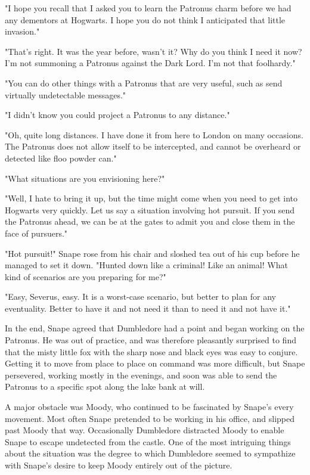 \documentclass[a4paper,11pt]{article}
\begin{document}
"I hope you recall that I asked you to learn the Patronus charm before we had any dementors at Hogwarts. I hope you do not think I anticipated that little invasion."

"That's right. It was the year before, wasn't it? Why do you think I need it now? I'm not summoning a Patronus against the Dark Lord. I'm not that foolhardy."

"You can do other things with a Patronus that are very useful, such as send virtually undetectable messages."

"I didn't know you could project a Patronus to any distance."

"Oh, quite long distances. I have done it from here to London on many occasions. The Patronus does not allow itself to be intercepted, and cannot be overheard or detected like floo powder can."

"What situations are you envisioning here?"

"Well, I hate to bring it up, but the time might come when you need to get into Hogwarts very quickly. Let us say a situation involving hot pursuit. If you send the Patronus ahead, we can be at the gates to admit you and close them in the face of pursuers."

"Hot pursuit!" Snape rose from his chair and sloshed tea out of his cup before he managed to set it down. "Hunted down like a criminal! Like an animal! What kind of scenarios are you preparing for me?"

"Easy, Severus, easy. It is a worst-case scenario, but better to plan for any eventuality. Better to have it and not need it than to need it and not have it."

In the end, Snape agreed that Dumbledore had a point and began working on the Patronus. He was out of practice, and was therefore pleasantly surprised to find that the misty little fox with the sharp nose and black eyes was easy to conjure. Getting it to move from place to place on command was more difficult, but Snape persevered, working mostly in the evenings, and soon was able to send the Patronus to a specific spot along the lake bank at will.

A major obstacle was Moody, who continued to be fascinated by Snape's every movement. Most often Snape pretended to be working in his office, and slipped past Moody that way. Occasionally Dumbledore distracted Moody to enable Snape to escape undetected from the castle. One of the most intriguing things about the situation was the degree to which Dumbledore seemed to sympathize with Snape's desire to keep Moody entirely out of the picture.
\end{document}

